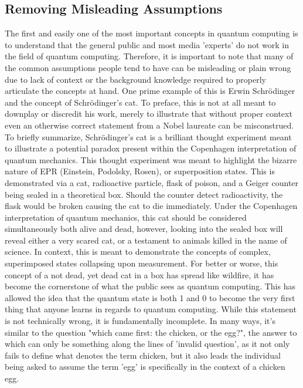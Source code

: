 \documentclass[a4paper]{article}
\begin{document}
\subsection{Removing Misleading Assumptions}
The first and easily one of the most important concepts in quantum computing is to understand that the general public and most media 'experts' do not work in the field of quantum computing.  Therefore, it is important to note that many of the common assumptions people tend to have can be misleading or plain wrong due to lack of context or the background knowledge required to properly articulate the concepts at hand.\newline
\newline
One prime example of this is Erwin Schrödinger and the concept of Schrödinger's cat.  To preface, this is not at all meant to downplay or discredit his work, merely to illustrate that without proper context even an otherwise correct statement from a Nobel laureate can be misconstrued.  \newline
\newline %
To briefly summarize, Schrödinger's cat is a brilliant thought experiment meant to illustrate a potential paradox present within the Copenhagen interpretation of quantum mechanics.  This thought experiment was meant to highlight the bizarre nature of EPR (Einstein, Podolsky, Rosen), or superposition states.  This is demonstrated via a cat, radioactive particle, flask of poison, and a Geiger counter being sealed in a theoretical box.  Should the counter detect radioactivity, the flask would be broken causing the cat to die immediately.  Under the Copenhagen interpretation of quantum mechanics, this cat should be considered simultaneously both alive and dead, however, looking into the sealed box will reveal either a very scared cat, or a testament to animals killed in the name of science. \newline
\newline
 In context, this is meant to demonstrate the concepts of complex, superimposed states collapsing upon measurement. For better or worse, this concept of a not dead, yet dead cat in a box has spread like wildfire, it has become the cornerstone of what the public sees as quantum computing. This has allowed the idea that the quantum state is both 1 and 0 to become the very first thing that anyone learns in regards to quantum computing.  While this statement is not technically wrong, it is fundamentally incomplete. In many ways, it's similar to the question "which came first: the chicken, or the egg?", the answer to which can only be something along the lines of 'invalid question', as it not only fails to define what denotes the term chicken, but it also leads the individual being asked to assume the term 'egg' is specifically in the context of a chicken egg. \newline
\end{document}
